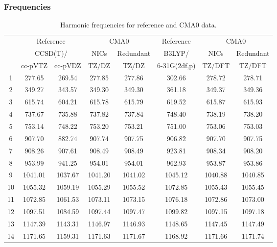 \documentclass[10pt,oneside]{article}
\begin{document}
\begin{table}[h!]
\subsubsection*{Frequencies}
\centering
\caption{Harmonic frequencies for reference and CMA0 data.}
\begin{tabular}{cccccccc}
\toprule
{} & \multicolumn{2}{c}{Reference} & \multicolumn{2}{c}{CMA0} &    Reference & \multicolumn{2}{c}{CMA0} \\
{} & \multicolumn{2}{c}{CCSD(T)/} &    NICs &  Redundant &       B3LYP/ &    NICs & Redundant \\
{} &   cc-pVTZ & cc-pVDZ &   TZ/DZ &      TZ/DZ & 6-31G(2df,p) &  TZ/DFT &    TZ/DFT \\
\midrule
1  &    277.65 &  269.54 &  277.85 &     277.86 &       302.66 &  278.72 &    278.71 \\
2  &    349.27 &  343.57 &  349.30 &     349.30 &       361.18 &  349.37 &    349.36 \\
3  &    615.74 &  604.21 &  615.78 &     615.79 &       619.52 &  615.87 &    615.93 \\
4  &    737.67 &  735.88 &  737.82 &     737.84 &       748.40 &  738.19 &    738.20 \\
5  &    753.14 &  748.22 &  753.20 &     753.21 &       751.00 &  753.06 &    753.03 \\
6  &    907.70 &  882.74 &  907.74 &     907.75 &       906.82 &  907.70 &    907.75 \\
7  &    908.26 &  907.61 &  908.49 &     908.49 &       923.81 &  908.34 &    908.20 \\
8  &    953.99 &  941.25 &  954.01 &     954.01 &       962.93 &  953.87 &    953.86 \\
9  &   1041.01 & 1037.67 & 1041.20 &    1041.02 &      1045.12 & 1040.88 &   1040.85 \\
10 &   1055.32 & 1059.19 & 1055.29 &    1055.52 &      1072.85 & 1055.43 &   1055.45 \\
11 &   1072.85 & 1061.53 & 1073.11 &    1073.15 &      1076.18 & 1072.86 &   1073.00 \\
12 &   1097.51 & 1084.59 & 1097.44 &    1097.47 &      1099.82 & 1097.15 &   1097.18 \\
13 &   1147.39 & 1143.31 & 1146.97 &    1146.93 &      1148.65 & 1147.45 &   1147.49 \\
14 &   1171.65 & 1159.31 & 1171.63 &    1171.67 &      1168.92 & 1171.66 &   1171.74 \\

\end{tabular}
\end{table}
\end{document}
